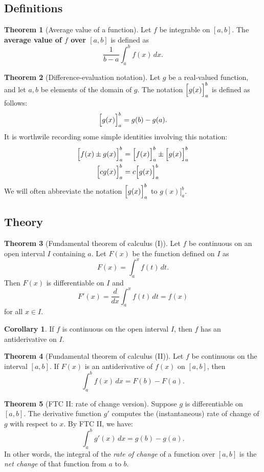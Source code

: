 \documentclass[11pt]{article}
\theoremstyle{definition}
\newtheorem*{corollary}{Corollary}
\theoremstyle{named}
\newtheorem*{namedtheorem}{Theorem}
\numberwithin{myalgctr}{section}
\begin{document}
\thispagestyle{fancy}
\subsection*{Definitions}
\begin{namedtheorem}[Average value of a function] Let $f$ be integrable on $[a,b]$. The {\bf average value of $f$ over $[a,b]$} is defined as
  \[
  \frac{1}{b-a}\int_a^bf(x)\, dx.
  \]
\end{namedtheorem}
\begin{namedtheorem}[Difference-evaluation notation] Let $g$ be a real-valued function, and let $a,b$ be elements of the domain of $g$. The notation $\Bigl[g(x)\Bigr]_a^b$  is defined as follows:
  \[
  \Bigl[ g(x)\Bigr ]_a^b=g(b)-g(a).
  \]
  It is worthwile recording some simple identities involving this notation:
  \begin{align*}
    \Bigl[ f(x)\pm g(x)\Bigr ]_a^b&=\Bigl[f(x)\Bigr ]_a^b\pm \Bigl[ g(x)\Bigr ]_a^b\\
    \Bigl[ cg(x)\Bigr]_a^b&=c\Bigl[g(x)\Bigr]_a^b
  \end{align*}
  We will often abbreviate the notation $\Bigl[g(x)\Bigr]_a^b$ to $g(x)\Bigr]_a^b$.
\end{namedtheorem}

 \subsection*{Theory}
\begin{namedtheorem}[Fundamental theorem of calculus (I)] Let $f$ be continuous on an open interval $I$ containing $a$. Let $F(x)$ be the function defined on $I$ as
  \[
  F(x)=\int_a^x f(t)\, dt.
  \]
Then $F(x)$ is differentiable on $I$ and
\[
F'(x)=\frac{d}{dx}\int_a^xf(t)\, dt=f(x)
\]
for all $x\in I$.
\end{namedtheorem}
\begin{corollary}
  If $f$ is continuous on the open interval $I$, then $f$ has an antiderivative on $I$.
\end{corollary}
\begin{namedtheorem}[Fundamental theorem of calculus (II)] Let $f$ be continuous on the interval $[a,b]$. If $F(x)$ is an antiderivative of $f(x)$ on $[a,b]$, then
  \[
  \int_a^b f(x)\, dx=F(b)-F(a).
  \]

\end{namedtheorem}
\begin{namedtheorem}[FTC II: rate of change version] Suppose $g$ is differentiable on $[a,b]$. The derivative function $g'$ computes the (instantaneous) rate of change of $g$ with respect to $x$. By FTC II, we have:
  \[
  \int_a^b g'(x)\, dx=g(b)-g(a).
  \]
  In other words, the integral of the {\em rate of change} of a function over $[a,b]$ is the {\em net change} of that function from $a$ to $b$.

\end{namedtheorem}
\end{document}
